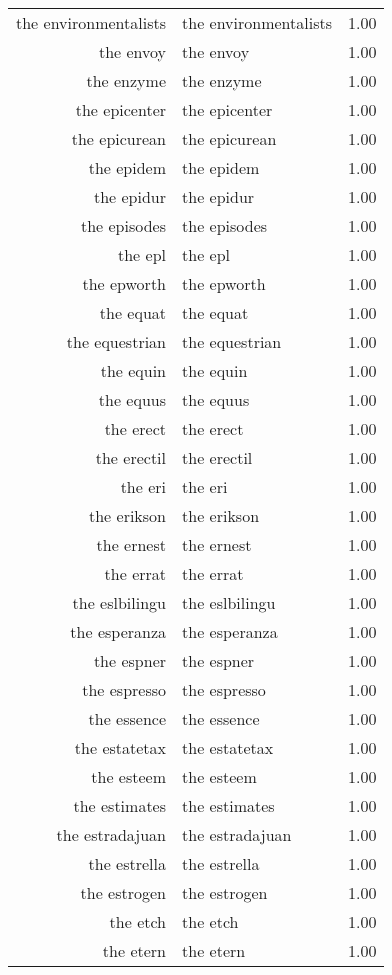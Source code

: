 \begin{table}[ht]
\begin{tabular}{rlr}
  the environmentalists & the environmentalists & 1.00 \\ 
  the envoy & the envoy & 1.00 \\ 
  the enzyme & the enzyme & 1.00 \\ 
  the epicenter & the epicenter & 1.00 \\ 
  the epicurean & the epicurean & 1.00 \\ 
  the epidem & the epidem & 1.00 \\ 
  the epidur & the epidur & 1.00 \\ 
  the episodes & the episodes & 1.00 \\ 
  the epl & the epl & 1.00 \\ 
  the epworth & the epworth & 1.00 \\ 
  the equat & the equat & 1.00 \\ 
  the equestrian & the equestrian & 1.00 \\ 
  the equin & the equin & 1.00 \\ 
  the equus & the equus & 1.00 \\ 
  the erect & the erect & 1.00 \\ 
  the erectil & the erectil & 1.00 \\ 
  the eri & the eri & 1.00 \\ 
  the erikson & the erikson & 1.00 \\ 
  the ernest & the ernest & 1.00 \\ 
  the errat & the errat & 1.00 \\ 
  the eslbilingu & the eslbilingu & 1.00 \\ 
  the esperanza & the esperanza & 1.00 \\ 
  the espner & the espner & 1.00 \\ 
  the espresso & the espresso & 1.00 \\ 
  the essence & the essence & 1.00 \\ 
  the estatetax & the estatetax & 1.00 \\ 
  the esteem & the esteem & 1.00 \\ 
  the estimates & the estimates & 1.00 \\ 
  the estradajuan & the estradajuan & 1.00 \\ 
  the estrella & the estrella & 1.00 \\ 
  the estrogen & the estrogen & 1.00 \\ 
  the etch & the etch & 1.00 \\ 
  the etern & the etern & 1.00 \\ 

\end{tabular}
\end{table}
